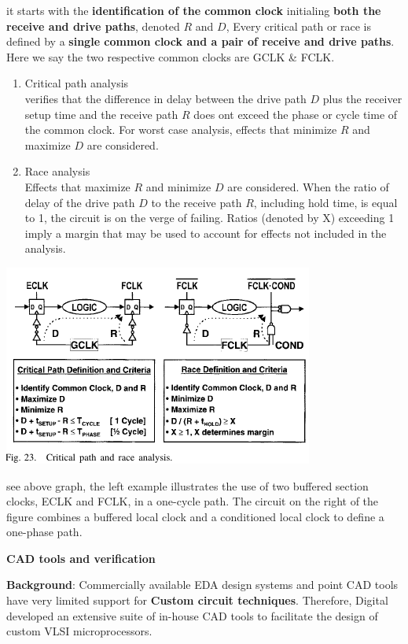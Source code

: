 \documentclass[11pt]{article}
\begin{document}
it starts with the \textbf{identification of the common clock} initialing \textbf{both the receive and drive paths}, denoted $ R $ and $ D $, Every critical path or race is defined by a \textbf{single common clock and a pair of receive and drive paths}. Here we say the two respective common clocks are GCLK \& FCLK. 
\begin{enumerate}
	\item Critical path analysis \\
	verifies that the difference in delay between the drive path $ D $ plus the receiver setup time and the receive path $ R $ does ont exceed the phase or cycle time of the common clock. For worst case analysis, effects that minimize $ R $ and maximize $ D $ are considered.
	\item Race analysis \\
	Effects that maximize $ R $ and minimize $ D $ are considered. When the ratio of delay of the drive path $ D $ to the receive path $ R $, including hold time, is equal to 1, the circuit is on the verge of failing. Ratios (denoted by X) exceeding 1 imply a margin that may be used to account for effects not included in the analysis. 
\end{enumerate}
\begin{center}
\includegraphics[scale=0.5]{path.png}
\end{center} 
see above graph, the left example illustrates the use of two buffered section clocks, ECLK and FCLK, in a one-cycle path. The circuit on the right of the figure combines a buffered local clock and a conditioned local clock to define a one-phase path.

\textbf{CAD tools and verification}

\textbf{Background}: Commercially available EDA design systems and point CAD tools have very limited support for \textbf{Custom circuit techniques}. Therefore, Digital developed an extensive suite of in-house CAD tools to facilitate the design of custom VLSI microprocessors. 
\end{document}
